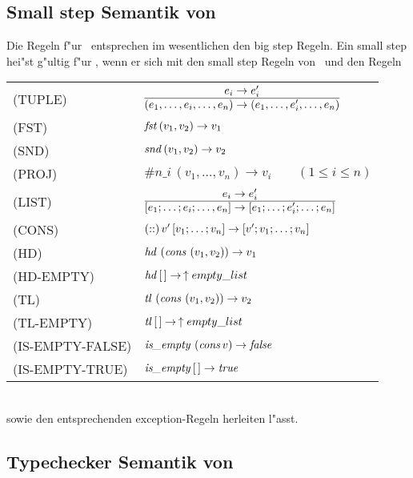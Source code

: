 \subsection{Small step Semantik von \LTHREE}

Die  Regeln f"ur \LTHREE\ entsprechen im wesentlichen den big step Regeln. Ein small step hei"st g"ultig f"ur
\LTHREE, wenn er sich mit den small step Regeln von \LTWO\ und den Regeln\\[5mm]
  \begin{tabular}{ll}
    \mbox{(TUPLE)}          & $\regel{e_i \to e_i'}
                                     {(e_1,\ldots,e_i,\ldots,e_n) \to (e_1,\ldots,e_i',\ldots,e_n)}$ \\[5mm]
    \mbox{(FST)}            & ${\text{\it fst\/}}\,(v_1,v_2) \to v_1$ \\[3mm]
    \mbox{(SND)}            & ${\text{\it snd\/}}\,(v_1,v_2) \to v_2$ \\[3mm]
    \mbox{(PROJ)}           & $\#n\_i\,(v_1,\ldots,v_n) \to v_i \qquad (1 \le i \le n)$ \\[3mm]
    \mbox{(LIST)}           & $\regel{e_i \to e_i'}
                                     {[e_1;\ldots;e_i;\ldots,e_n] \to [e_1;\ldots;e_i';\ldots;e_n]}$ \\[5mm]
    \mbox{(CONS)}           & $(\mathrel{::})\,v'\,[v_1;\ldots;v_n] \to [v';v_1;\ldots;v_n]$ \\[3mm]
    \mbox{(HD)}             & ${\text{\it hd\/}}\,\left({\text{\it cons\/}}\,\left(v_1,v_2\right)\right) \to v_1$ \\[3mm]
    \mbox{(HD-EMPTY)}       & ${\text{\it hd\/}}\,[\,] \to \, \uparrow empty\_list$ \\[3mm]
    \mbox{(TL)}             & ${\text{\it tl\/}}\,\left({\text{\it cons\/}}\,\left(v_1,v_2\right)\right) \to v_2$ \\[3mm]
    \mbox{(TL-EMPTY)}       & ${\text{\it tl\/}}\,[\,] \to \, \uparrow empty\_list$ \\[3mm]
    \mbox{(IS-EMPTY-FALSE)} & ${\text{\it is\_empty\/}}\,\left({\text{\it cons\/}}\,v\right) \to {\text{\it false\/}}$ \\[3mm]
    \mbox{(IS-EMPTY-TRUE)}  & ${\text{\it is\_empty\/}}\,[\,] \to {\text{\it true\/}}$
  \end{tabular}\\[7mm]
sowie den entsprechenden exception-Regeln herleiten l"asst.


\subsection{Typechecker Semantik von \LTHREE}

